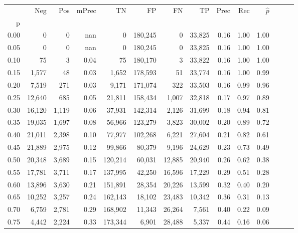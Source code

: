 \begin{tabular}{rrrrrrrrrrrrrr}
\toprule
{} &     Neg &    Pos & mPrec &       TN &       FP &      FN &      TP &  Prec &   Rec & $\hat{p}$ \\
p    &         &        &       &          &          &         &         &       &       &           \\
\midrule
0.00 &       0 &      0 &   nan &        0 &  180,245 &       0 &  33,825 &  0.16 &  1.00 &      1.00 \\
0.05 &       0 &      0 &   nan &        0 &  180,245 &       0 &  33,825 &  0.16 &  1.00 &      1.00 \\
0.10 &      75 &      3 &  0.04 &       75 &  180,170 &       3 &  33,822 &  0.16 &  1.00 &      1.00 \\
0.15 &   1,577 &     48 &  0.03 &    1,652 &  178,593 &      51 &  33,774 &  0.16 &  1.00 &      0.99 \\
0.20 &   7,519 &    271 &  0.03 &    9,171 &  171,074 &     322 &  33,503 &  0.16 &  0.99 &      0.96 \\
0.25 &  12,640 &    685 &  0.05 &   21,811 &  158,434 &   1,007 &  32,818 &  0.17 &  0.97 &      0.89 \\
0.30 &  16,120 &  1,119 &  0.06 &   37,931 &  142,314 &   2,126 &  31,699 &  0.18 &  0.94 &      0.81 \\
0.35 &  19,035 &  1,697 &  0.08 &   56,966 &  123,279 &   3,823 &  30,002 &  0.20 &  0.89 &      0.72 \\
0.40 &  21,011 &  2,398 &  0.10 &   77,977 &  102,268 &   6,221 &  27,604 &  0.21 &  0.82 &      0.61 \\
0.45 &  21,889 &  2,975 &  0.12 &   99,866 &   80,379 &   9,196 &  24,629 &  0.23 &  0.73 &      0.49 \\
0.50 &  20,348 &  3,689 &  0.15 &  120,214 &   60,031 &  12,885 &  20,940 &  0.26 &  0.62 &      0.38 \\
0.55 &  17,781 &  3,711 &  0.17 &  137,995 &   42,250 &  16,596 &  17,229 &  0.29 &  0.51 &      0.28 \\
0.60 &  13,896 &  3,630 &  0.21 &  151,891 &   28,354 &  20,226 &  13,599 &  0.32 &  0.40 &      0.20 \\
0.65 &  10,252 &  3,257 &  0.24 &  162,143 &   18,102 &  23,483 &  10,342 &  0.36 &  0.31 &      0.13 \\
0.70 &   6,759 &  2,781 &  0.29 &  168,902 &   11,343 &  26,264 &   7,561 &  0.40 &  0.22 &      0.09 \\
0.75 &   4,442 &  2,224 &  0.33 &  173,344 &    6,901 &  28,488 &   5,337 &  0.44 &  0.16 &      0.06 \\

\end{tabular}
